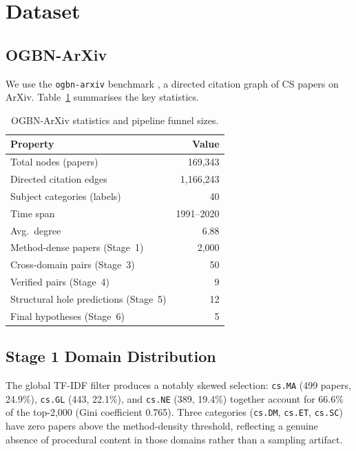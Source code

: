 \documentclass[11pt]{article}
\begin{document}
\section{Dataset}

\subsection{OGBN-ArXiv}

We use the \texttt{ogbn-arxiv} benchmark \citep{hu2020open}, a directed
citation graph of CS papers on ArXiv. Table~\ref{tab:dataset} summarises
the key statistics.

\begin{table}[h]
\small
\centering
\begin{tabular}{lr}
\toprule
\textbf{Property} & \textbf{Value} \\
\midrule
Total nodes (papers) & 169,343 \\
Directed citation edges & 1,166,243 \\
Subject categories (labels) & 40 \\
Time span & 1991--2020 \\
Avg.\ degree & 6.88 \\
\midrule
Method-dense papers (Stage~1) & 2,000 \\
Cross-domain pairs (Stage~3) & 50 \\
Verified pairs (Stage~4) & 9 \\
Structural hole predictions (Stage~5) & 12 \\
Final hypotheses (Stage~6) & 5 \\
\bottomrule
\end{tabular}
\caption{OGBN-ArXiv statistics and pipeline funnel sizes.}
\label{tab:dataset}
\end{table}

\subsection{Stage 1 Domain Distribution}

The global TF-IDF filter produces a notably skewed selection:
\texttt{cs.MA} (499 papers, 24.9\%), \texttt{cs.GL} (443, 22.1\%),
and \texttt{cs.NE} (389, 19.4\%) together account for 66.6\% of the
top-2,000 (Gini coefficient 0.765). Three categories
(\texttt{cs.DM}, \texttt{cs.ET}, \texttt{cs.SC}) have zero papers
above the method-density threshold, reflecting a genuine absence of
procedural content in those domains rather than a sampling artifact.
\end{document}
